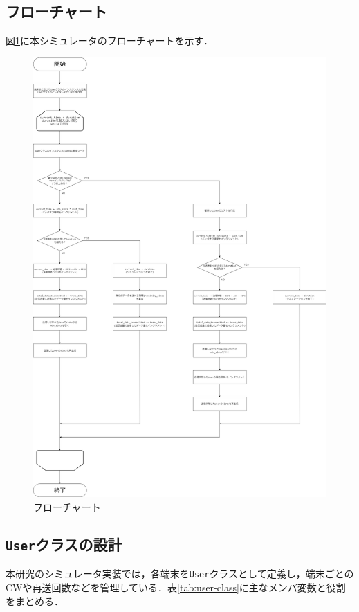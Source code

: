 \documentclass[a4paper,10pt]{ltjsarticle}
\begin{document}
\subsection{フローチャート}
図\ref{flowchart}に本シミュレータのフローチャートを示す．


\begin{figure}[H]
  \centering
  \includegraphics[width=1\textwidth]{./assets/flowchart.drawio.png}
  \caption{フローチャート}
  \label{flowchart}
\end{figure}



\subsection{\texttt{User}クラスの設計}
本研究のシミュレータ実装では，各端末を\texttt{User}クラスとして定義し，端末ごとのCWや再送回数などを管理している．表\ref{tab:user-class}に主なメンバ変数と役割をまとめる．
\end{document}
